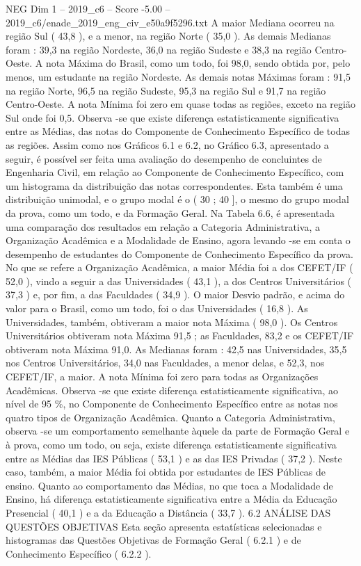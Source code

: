 \begin{textsample}{NEG Dim 1 – 2019\_c6 – Score -5.00 – 2019\_c6/enade\_2019\_eng\_civ\_e50a9f5296.txt}
A maior Mediana ocorreu na região Sul ( 43,8 ), e a menor, na região Norte ( 35,0 ).
As demais Medianas foram : 39,3 na região Nordeste, 36,0 na região Sudeste e 38,3 na região Centro-Oeste.
A nota Máxima do Brasil, como um todo, foi 98,0, sendo obtida por, pelo menos, um estudante na região Nordeste.
As demais notas Máximas foram : 91,5 na região Norte, 96,5 na região Sudeste, 95,3 na região Sul e 91,7 na região Centro-Oeste.
A nota Mínima foi zero em quase todas as regiões, exceto na região Sul onde foi 0,5.
Observa -se que existe diferença estatisticamente significativa entre as Médias, das notas do Componente de Conhecimento Específico de todas as regiões.
Assim como nos Gráficos 6.1 e 6.2, no Gráfico 6.3, apresentado a seguir, é possível ser feita uma avaliação do desempenho de concluintes de Engenharia Civil, em relação ao Componente de Conhecimento Específico, com um histograma da distribuição das notas correspondentes.
Esta também é uma distribuição unimodal, e o grupo modal é o ( 30 ; 40 ], o mesmo do grupo modal da prova, como um todo, e da Formação Geral.
Na Tabela 6.6, é apresentada uma comparação dos resultados em relação a Categoria Administrativa, a Organização Acadêmica e a Modalidade de Ensino, agora levando -se em conta o desempenho de estudantes do Componente de Conhecimento Específico da prova.
No que se refere a Organização Acadêmica, a maior Média foi a dos CEFET/IF ( 52,0 ), vindo a seguir a das Universidades ( 43,1 ), a dos Centros Universitários ( 37,3 ) e, por fim, a das Faculdades ( 34,9 ).
O maior Desvio padrão, e acima do valor para o Brasil, como um todo, foi o das Universidades ( 16,8 ).
As Universidades, também, obtiveram a maior nota Máxima ( 98,0 ).
Os Centros Universitários obtiveram nota Máxima 91,5 ; as Faculdades, 83,2 e os CEFET/IF obtiveram nota Máxima 91,0.
As Medianas foram : 42,5 nas Universidades, 35,5 nos Centros Universitários, 34,0 nas Faculdades, a menor delas, e 52,3, nos CEFET/IF, a maior.
A nota Mínima foi zero para todas as Organizações Acadêmicas.
Observa -se que existe diferença estatisticamente significativa, ao nível de 95 \%, no Componente de Conhecimento Específico entre as notas nos quatro tipos de Organização Acadêmica.
Quanto a Categoria Administrativa, observa -se um comportamento semelhante àquele da parte de Formação Geral e à prova, como um todo, ou seja, existe diferença estatisticamente significativa entre as Médias das IES Públicas ( 53,1 ) e as das IES Privadas ( 37,2 ).
Neste caso, também, a maior Média foi obtida por estudantes de IES Públicas de ensino.
Quanto ao comportamento das Médias, no que toca a Modalidade de Ensino, há diferença estatisticamente significativa entre a Média da Educação Presencial ( 40,1 ) e a da Educação a Distância ( 33,7 ). 6.2 ANÁLISE DAS QUESTÕES OBJETIVAS Esta seção apresenta estatísticas selecionadas e histogramas das Questões Objetivas de Formação Geral ( 6.2.1 ) e de Conhecimento Específico ( 6.2.2 ).

\end{textsample}
